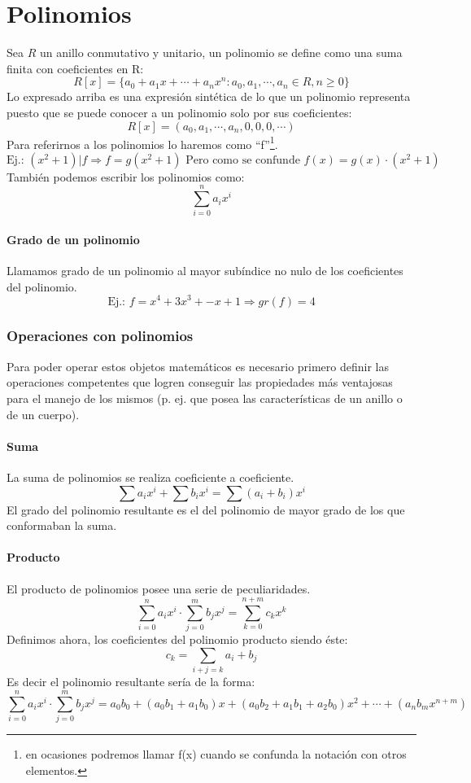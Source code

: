 \documentclass[10pt,a4paper,openright]{book}
\theoremstyle{break}
\begin{document}
\chapter{Polinomios}
Sea $R$ un anillo conmutativo y unitario, un polinomio se define como una suma finita con coeficientes en R:
$$R[x]=\{a_0+a_1x+\cdots+a_nx^n : a_0,a_1,\cdots,a_n\in R, n\geq 0\}$$
Lo expresado arriba es una expresión sintética de lo que un polinomio representa puesto que se puede conocer a un polinomio solo por sus coeficientes:
$$R[x]=(a_0,a_1,\cdots,a_n,0,0,0,\cdots)$$
Para referirnos a los polinomios lo haremos como ``f''\footnote{en ocasiones podremos llamar f(x) cuando se confunda la notación con otros elementos.}.
$$\mbox{Ej.: } (x^2+1)|f\Rightarrow f=g(x^2+1) \mbox{ Pero como se confunde } f(x)=g(x)\cdot (x^2+1)$$
También podemos escribir los polinomios como:
$$\sum_{i=0}^{n} a_ix^i$$

\subsubsection*{Grado de un polinomio}
Llamamos grado de un polinomio al mayor subíndice no nulo de los coeficientes del polinomio.
$$\mbox{Ej.: } f=x^4+3x^3+-x+1 \Rightarrow gr(f)=4$$

\subsection{Operaciones con polinomios}
Para poder operar estos objetos matemáticos es necesario primero definir las operaciones competentes que logren conseguir las propiedades más ventajosas para el manejo de los mismos (p. ej. que posea las características de un anillo o de un cuerpo).
\subsubsection*{Suma}
La suma de polinomios se realiza coeficiente a coeficiente.
$$\sum a_ix^i+\sum b_ix^i=\sum (a_i+b_i)x^i$$
El grado del polinomio resultante es el del polinomio de mayor grado de los que conformaban la suma.

\subsubsection*{Producto}
El producto de polinomios posee una serie de peculiaridades.
$$\sum_{i=0}^n a_ix^i\cdot \sum_{j=0}^m b_jx^j=\sum_{k=0}^{n+m} c_kx^k$$
Definimos ahora, los coeficientes del polinomio producto siendo éste:
$$c_k=\sum_{i+j=k} a_i+b_j$$
Es decir el polinomio resultante sería de la forma:
$$\sum_{i=0}^n a_ix^i\cdot \sum_{j=0}^m b_jx^j=a_0b_0+(a_0b_1+a_1b_0)x+(a_0b_2+a_1b_1+a_2b_0)x^2+\cdots+(a_nb_mx^{n+m})$$
\end{document}
